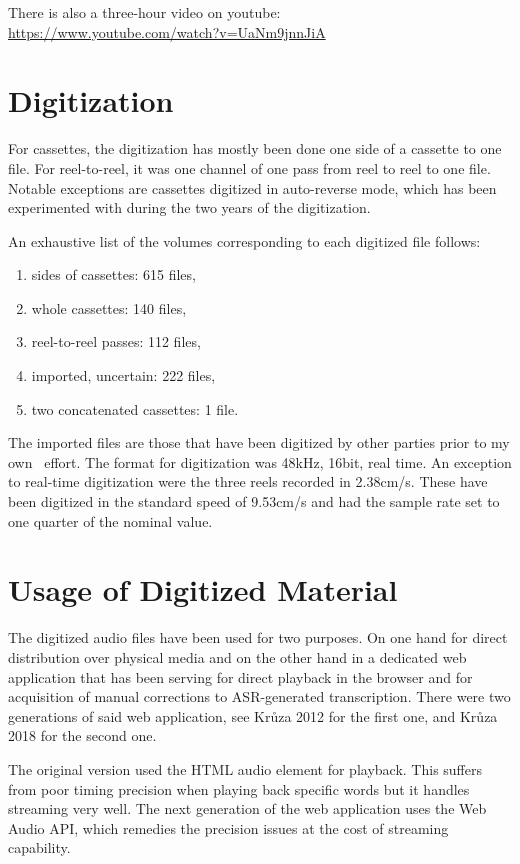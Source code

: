 \documentclass[conference]{IEEEtran}
\begin{document}
There is also a three-hour video on youtube: \\
\url{https://www.youtube.com/watch?v=UaNm9jnnJiA}

\section{Digitization}

For cassettes, the digitization has mostly been done one side of a cassette to
one file. For reel-to-reel, it was one channel of one pass from reel to reel to one file. Notable exceptions are cassettes digitized in auto-reverse mode, which has been experimented with during the two years of the digitization. 

An exhaustive list of the volumes corresponding to each digitized file follows:
\begin{enumerate}
    \item{sides of cassettes: 615 files,}
    \item{whole cassettes: 140 files,}
    \item{reel-to-reel passes: 112 files,}
    \item{imported, uncertain: 222 files,}
    \item{two concatenated cassettes: 1 file.}
\end{enumerate}

The imported files are those that have been digitized by other parties prior to my own  effort. The format for digitization was 48kHz, 16bit, real time. An exception to real-time digitization were the three reels recorded in 2.38cm/s. These have been digitized in the standard speed of 9.53cm/s and had the sample rate set to one quarter of the nominal value.

\section{Usage of Digitized Material}

The digitized audio files have been used for two purposes. On one hand for
direct distribution over physical media and on the other hand in a dedicated web
application that has been serving for direct playback in the browser and for
acquisition of manual corrections to ASR-generated\cite{ircing2001large} transcription. There were
two generations of said web application, see Krůza 2012\cite{kruuza2012making} for the first one,
and Krůza 2018\cite{biblio:KrKuSecondGenerationWeb2018} for the second one.

The original version used the HTML audio element for playback. This suffers from
poor timing precision when playing back specific words but it handles streaming
very well. The next generation of the web application uses the Web Audio API,
which remedies the precision issues at the cost of streaming capability.
\end{document}
